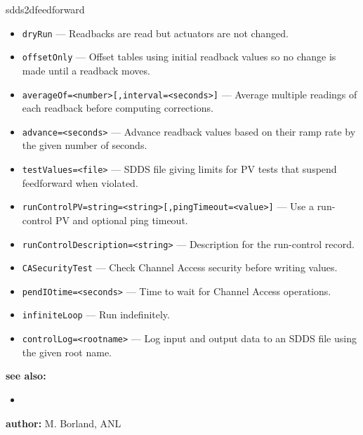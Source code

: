 \begin{sddsprog}{sdds2dfeedforward}
\begin{itemize}
  \item {\tt dryRun} --- Readbacks are read but actuators are not changed.
  \item {\tt offsetOnly} --- Offset tables using initial readback values so
               no change is made until a readback moves.
  \item {\tt averageOf=<number>[,interval=<seconds>]} --- Average multiple
               readings of each readback before computing corrections.
  \item {\tt advance=<seconds>} --- Advance readback values based on their
               ramp rate by the given number of seconds.
  \item {\tt testValues=<file>} --- SDDS file giving limits for PV tests that
               suspend feedforward when violated.
  \item {\tt runControlPV=string=<string>[,pingTimeout=<value>]} --- Use a
               run-control PV and optional ping timeout.
  \item {\tt runControlDescription=<string>} --- Description for the
               run-control record.
  \item {\tt CASecurityTest} --- Check Channel Access security before
               writing values.
  \item {\tt pendIOtime=<seconds>} --- Time to wait for Channel Access
               operations.
  \item {\tt infiniteLoop} --- Run indefinitely.
  \item {\tt controlLog=<rootname>} --- Log input and output data to an
               SDDS file using the given root name.
\end{itemize}
\item \textbf{see also:}
\begin{itemize}
  \item {}
\end{itemize}
\item \textbf{author:} M. Borland, ANL
\end{sddsprog}
